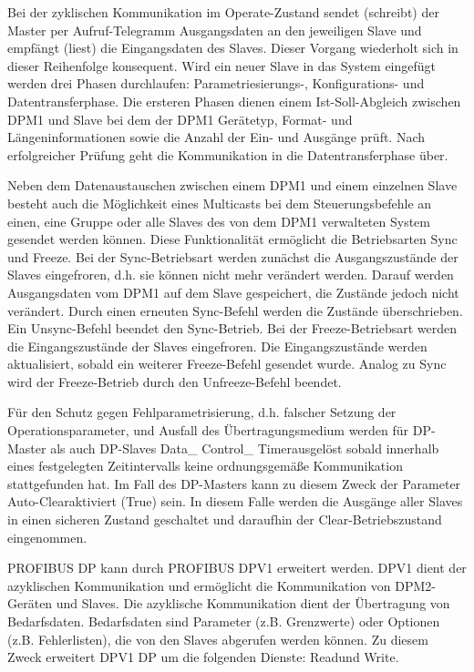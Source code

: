 Bei der zyklischen Kommunikation im \glqq Operate\grqq -Zustand sendet (schreibt) der Master per Aufruf-Telegramm Ausgangsdaten an den jeweiligen Slave und empfängt (liest) die Eingangsdaten des Slaves. Dieser Vorgang wiederholt sich in dieser Reihenfolge konsequent. Wird ein neuer Slave in das System eingefügt werden drei Phasen durchlaufen: Parametriesierungs-, Konfigurations- und Datentransferphase. Die ersteren Phasen dienen einem Ist-Soll-Abgleich zwischen DPM1 und Slave bei dem der DPM1 Gerätetyp, Format- und Längeninformationen sowie die Anzahl der Ein- und Ausgänge prüft. Nach erfolgreicher Prüfung geht die Kommunikation in die Datentransferphase über.


Neben dem Datenaustauschen zwischen einem DPM1 und einem einzelnen Slave besteht auch die Möglichkeit eines Multicasts bei dem Steuerungsbefehle an einen, eine Gruppe oder alle Slaves des von dem DPM1 verwalteten System gesendet werden können. Diese Funktionalität ermöglicht die Betriebsarten Sync und Freeze. 
Bei der Sync-Betriebsart werden zunächst die Ausgangszustände der Slaves eingefroren, d.h. sie können nicht mehr verändert werden. Darauf werden Ausgangsdaten vom DPM1 auf dem Slave gespeichert, die Zustände jedoch nicht verändert. Durch einen erneuten Sync-Befehl werden die Zustände überschrieben. Ein Unsync-Befehl beendet den Sync-Betrieb.
Bei der Freeze-Betriebsart werden die Eingangszustände der Slaves eingefroren. Die Eingangszustände werden aktualisiert, sobald ein weiterer Freeze-Befehl gesendet wurde. Analog zu Sync wird der Freeze-Betrieb durch den Unfreeze-Befehl beendet.


Für den Schutz gegen Fehlparametrisierung, d.h. falscher Setzung der Operationsparameter, und Ausfall des Übertragungsmedium werden für DP-Master als auch DP-Slaves \glqq Data\_ Control\_ Timer\grqq  ausgelöst sobald innerhalb eines festgelegten Zeitintervalls keine ordnungsgemäße Kommunikation stattgefunden hat. Im Fall des DP-Masters kann zu diesem Zweck der Parameter \glqq Auto-Clear\grqq  aktiviert (True) sein. In diesem Falle werden die Ausgänge aller Slaves in einen sicheren Zustand geschaltet und daraufhin der Clear-Betriebszustand eingenommen.


PROFIBUS DP kann durch PROFIBUS DPV1 erweitert werden. DPV1 dient der azyklischen Kommunikation und ermöglicht die Kommunikation von DPM2-Geräten und Slaves. Die azyklische Kommunikation dient der Übertragung von Bedarfsdaten. Bedarfsdaten sind Parameter (z.B. Grenzwerte) oder Optionen (z.B. Fehlerlisten), die von den Slaves abgerufen werden können. Zu diesem Zweck erweitert DPV1 DP um die folgenden Dienste: \glqq Read\grqq und \glqq Write\grqq .

